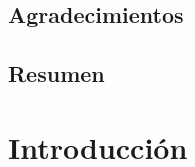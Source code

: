 \documentclass{report}
\begin{document}




\section*{Agradecimientos}


\section*{Resumen}


\tableofcontents

\chapter*{Introducción}




\end{document}
